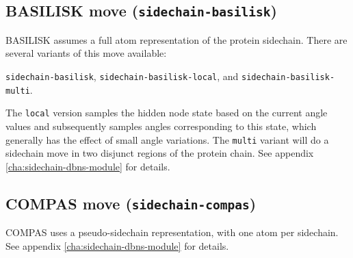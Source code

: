 
\subsection{BASILISK move (\texttt{sidechain-basilisk})}
\label{sec:basilisk-move}

BASILISK assumes a full atom representation of the protein
sidechain. There are several variants of this move available:

\begin{flushleft}
\texttt{sidechain-basilisk}, \texttt{sidechain-basilisk-local}, and \texttt{sidechain-basilisk-multi}.
\end{flushleft}

\noindent The \texttt{local} version samples the hidden node state
based on the current angle values and subsequently samples angles
corresponding to this state, which generally has the effect of small
angle variations. The \texttt{multi} variant will do a sidechain move
in two disjunct regions of the protein chain.  See appendix
\ref{cha:sidechain-dbns-module} for details.


\subsection{COMPAS move (\texttt{sidechain-compas})}
\label{sec:compas-move}

COMPAS uses a pseudo-sidechain representation, with one atom per
sidechain. See appendix \ref{cha:sidechain-dbns-module} for details.

